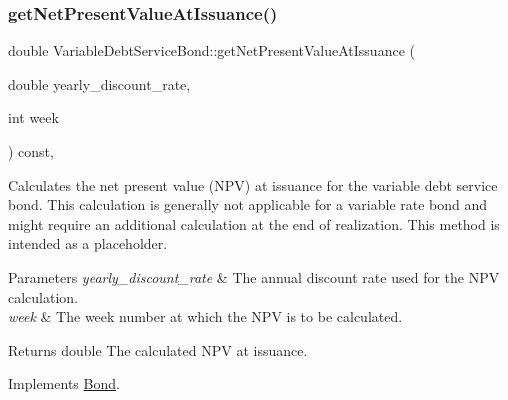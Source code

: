 \mbox{\label{classVariableDebtServiceBond_a8cc7ee442d788b91b8c00e6bed07644d}} 
\subsubsection{\texorpdfstring{get\+Net\+Present\+Value\+At\+Issuance()}{getNetPresentValueAtIssuance()}}
{\footnotesize\ttfamily double Variable\+Debt\+Service\+Bond\+::get\+Net\+Present\+Value\+At\+Issuance (\begin{DoxyParamCaption}\item[{double}]{yearly\+\_\+discount\+\_\+rate,  }\item[{int}]{week }\end{DoxyParamCaption}) const\hspace{0.3cm}{\ttfamily [override]}, {\ttfamily [virtual]}}



Calculates the net present value (N\+PV) at issuance for the variable debt service bond. This calculation is generally not applicable for a variable rate bond and might require an additional calculation at the end of realization. This method is intended as a placeholder. 


\begin{DoxyParams}{Parameters}
{\em yearly\+\_\+discount\+\_\+rate} & The annual discount rate used for the N\+PV calculation. \\
\hline
{\em week} & The week number at which the N\+PV is to be calculated.\\
\hline
\end{DoxyParams}
\begin{DoxyReturn}{Returns}
double The calculated N\+PV at issuance. 
\end{DoxyReturn}


Implements \mbox{\hyperlink{classBond_a5997278813deb16aa5d01bbca8ecc7b2}{Bond}}.

\mbox{\label{classVariableDebtServiceBond_aa5ad4fcc7c65154105388b332ae98198}} 
